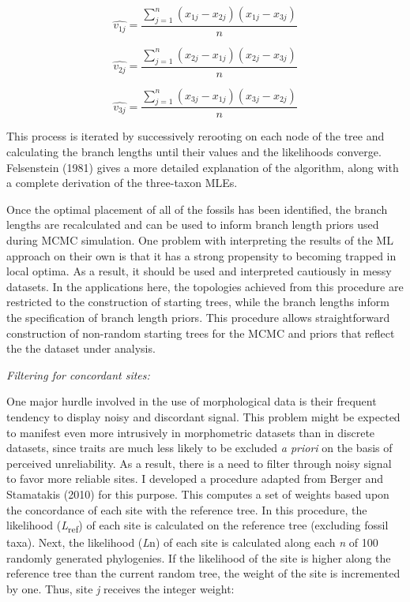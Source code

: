 \documentclass[12pt]{article}
\begin{document}
\begin{equation}
 \hat{v_{1j}} =   \frac{\sum\limits_{j=1}^{n}(x_{1j}- x_{2j}) (x_{1j} - x_{3j}) }{n}
\end{equation}

\begin{equation}
 \hat{v_{2j}} =   \frac{\sum\limits_{j=1}^{n}(x_{2j}- x_{1j}) (x_{2j} - x_{3j})}{n} 
\end{equation}

\begin{equation}
\hat{v_{3j}} =   \frac{\sum\limits_{j=1}^{n}(x_{3j}- x_{1j}) (x_{3j} - x_{2j})}{n}
\end{equation}


This process is iterated by successively rerooting on each node of the
tree and calculating the branch lengths until their values and the
likelihoods converge. Felsenstein (1981) gives a more detailed
explanation of the algorithm, along with a complete derivation of the
three-taxon MLEs.

Once the optimal placement of all of the fossils has been identified,
the branch lengths are recalculated and can be used to inform branch
length priors used during MCMC simulation. One problem with interpreting
the results of the ML approach on their own is that it has a strong
propensity to becoming trapped in local optima. As a result, it should
be used and interpreted cautiously in  messy datasets. In the
applications here, the topologies achieved from this procedure are
restricted to the construction of starting trees, while the branch
lengths inform the specification of branch length priors. This procedure
allows straightforward construction of non-random starting trees for the
MCMC and priors that reflect the the dataset under analysis.

\emph{Filtering for concordant sites:}

One major hurdle involved in the use of morphological data is their
frequent tendency to display noisy and discordant signal. This problem
might be expected to manifest even more intrusively in morphometric
datasets than in discrete datasets, since traits are much less likely to
be excluded \emph{a priori} on the basis of perceived unreliability. As
a result, there is a need to filter through noisy signal to favor more
reliable sites. I developed a procedure adapted from Berger and
Stamatakis (2010) for this purpose. This computes a set of weights based
upon the concordance of each site with the reference tree. In this
procedure, the likelihood (\emph{L}\textsubscript{ref}) of each site is calculated on
the reference tree (excluding fossil taxa). Next, the likelihood
(\emph{L}n) of each site is calculated along each \emph{n} of 100
randomly generated phylogenies. If the likelihood of the site is higher
along the reference tree than the current random tree, the weight of the
site is incremented by one. Thus, site \emph{j} receives the integer
weight:
\end{document}
